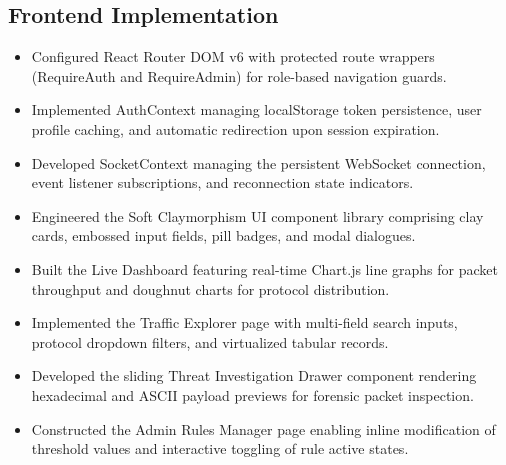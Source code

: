 \documentclass[a4paper,12pt]{report}
\begin{document}
	\subsection{Frontend Implementation}
	\begin{itemize}
		\item Configured React Router DOM v6 with protected route wrappers (RequireAuth and RequireAdmin) for role-based navigation guards.
		\item Implemented AuthContext managing localStorage token persistence, user profile caching, and automatic redirection upon session expiration.
		\item Developed SocketContext managing the persistent WebSocket connection, event listener subscriptions, and reconnection state indicators.
		\item Engineered the Soft Claymorphism UI component library comprising clay cards, embossed input fields, pill badges, and modal dialogues.
		\item Built the Live Dashboard featuring real-time Chart.js line graphs for packet throughput and doughnut charts for protocol distribution.
		\item Implemented the Traffic Explorer page with multi-field search inputs, protocol dropdown filters, and virtualized tabular records.
		\item Developed the sliding Threat Investigation Drawer component rendering hexadecimal and ASCII payload previews for forensic packet inspection.
		\item Constructed the Admin Rules Manager page enabling inline modification of threshold values and interactive toggling of rule active states.
	\end{itemize}
	
\end{document}

